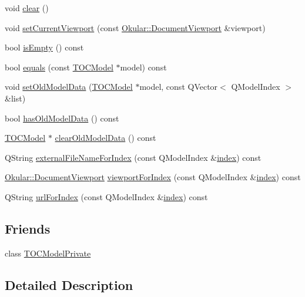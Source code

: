 \begin{DoxyCompactItemize}
\item 
void \hyperlink{classTOCModel_a13fcb8e3043be00cd784c7f4f212df43}{clear} ()
\item 
void \hyperlink{classTOCModel_a25d87b5313bdebaa05de74172e74f92b}{set\+Current\+Viewport} (const \hyperlink{classOkular_1_1DocumentViewport}{Okular\+::\+Document\+Viewport} \&viewport)
\item 
bool \hyperlink{classTOCModel_a2139ba87991f6c0e855ff6d65c5277ae}{is\+Empty} () const 
\item 
bool \hyperlink{classTOCModel_a9b92b7bb3d6a3feaff4055616e0379d7}{equals} (const \hyperlink{classTOCModel}{T\+O\+C\+Model} $\ast$model) const 
\item 
void \hyperlink{classTOCModel_a4500588182f65e687ccd77d5b9b8ee4d}{set\+Old\+Model\+Data} (\hyperlink{classTOCModel}{T\+O\+C\+Model} $\ast$model, const Q\+Vector$<$ Q\+Model\+Index $>$ \&list)
\item 
bool \hyperlink{classTOCModel_aa91c6a23d109985b0b058fed64638176}{has\+Old\+Model\+Data} () const 
\item 
\hyperlink{classTOCModel}{T\+O\+C\+Model} $\ast$ \hyperlink{classTOCModel_a09a24dc3c9f6769d2e832f63c5d5b5da}{clear\+Old\+Model\+Data} () const 
\item 
Q\+String \hyperlink{classTOCModel_ab5fef53179a00efdc6932d99568ba395}{external\+File\+Name\+For\+Index} (const Q\+Model\+Index \&\hyperlink{classTOCModel_a2ad29438ae7eb6c3085eeeb6cbe6d74d}{index}) const 
\item 
\hyperlink{classOkular_1_1DocumentViewport}{Okular\+::\+Document\+Viewport} \hyperlink{classTOCModel_a427c1248f5e04bcf6869319ae43f178b}{viewport\+For\+Index} (const Q\+Model\+Index \&\hyperlink{classTOCModel_a2ad29438ae7eb6c3085eeeb6cbe6d74d}{index}) const 
\item 
Q\+String \hyperlink{classTOCModel_abbf7b2e702a92df798c446772e4debae}{url\+For\+Index} (const Q\+Model\+Index \&\hyperlink{classTOCModel_a2ad29438ae7eb6c3085eeeb6cbe6d74d}{index}) const 
\end{DoxyCompactItemize}
\subsection*{Friends}
\begin{DoxyCompactItemize}
\item 
class \hyperlink{classTOCModel_a180c7f8e6908c3834c91e6c7c1d8937b}{T\+O\+C\+Model\+Private}
\end{DoxyCompactItemize}


\subsection{Detailed Description}


